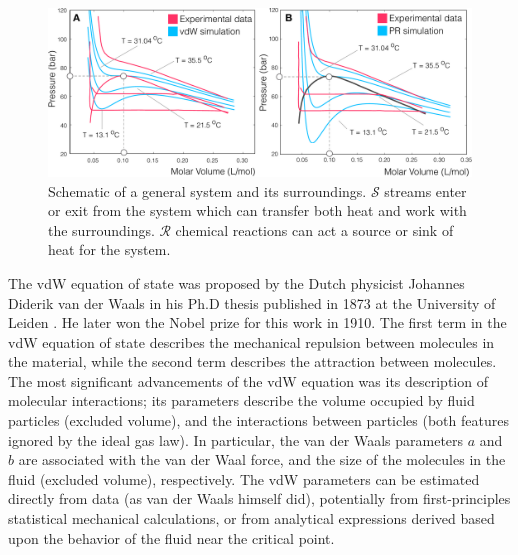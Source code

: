 \documentclass[11pt]{article}
\theoremstyle{definition}
\begin{document}
\begin{figure}\center
  \includegraphics[width=1.0\textwidth]{./figs/Fig-CubicEOS.pdf}
  \caption{Schematic of a general system and its surroundings.
  $\mathcal{S}$ streams enter or exit from the system which can transfer both heat and work with the surroundings.
  $\mathcal{R}$ chemical reactions can act a source or sink of heat for the system.}\label{fig-energy-schematic}
\end{figure}

The vdW equation of state was proposed by the Dutch physicist Johannes Diderik van der Waals in his Ph.D thesis published in 1873 at the University of Leiden
\cite{vdW-Thesis}. He later won the Nobel prize for this work in 1910. The first term in the vdW equation of state describes the mechanical repulsion between molecules in the material,
while the second term describes the attraction between molecules.
The most significant advancements of the vdW equation was its description of molecular interactions;
its parameters describe the volume occupied by fluid particles (excluded volume),
and the interactions between particles (both features ignored by the ideal gas law).
In particular, the van der Waals parameters $a$ and $b$ are associated with the van der Waal force,
and the size of the molecules in the fluid (excluded volume), respectively.
The vdW parameters can be estimated directly from data (as van der Waals himself did), potentially from first-principles statistical mechanical calculations,
or from analytical expressions derived based upon the behavior of the fluid near the critical point.
\end{document}
